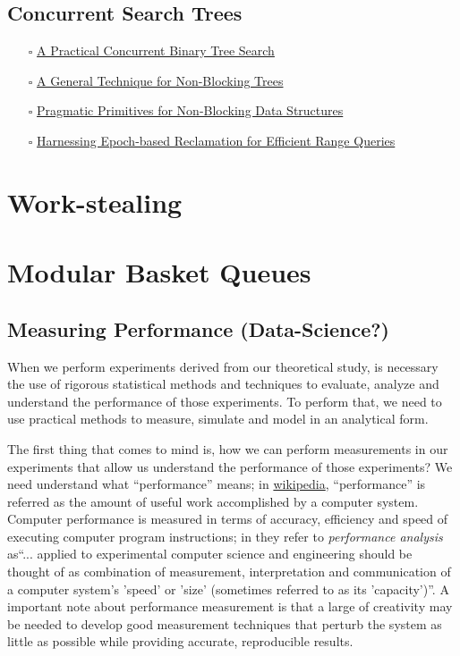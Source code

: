 \documentclass[openany, a4paper]{book}
\theoremstyle{break}
\theoremstyle{example}
\theoremstyle{note}
\theoremstyle{break}
\theoremstyle{exercise}
\begin{document}
\chapter{Concurrent Search Trees}
\label{sec:org516cccd}

\begin{itemize}
\item[{$\square$}] \href{http://ppl.stanford.edu/papers/ppopp207-bronson.pdf}{A Practical Concurrent Binary Tree Search}
\item[{$\square$}] \href{https://arxiv.org/abs/1712.06687}{A General Technique for Non-Blocking Trees}
\item[{$\square$}] \href{https://arxiv.org/abs/1712.06688}{Pragmatic Primitives for Non-Blocking Data Structures}
\item[{$\square$}] \href{http://www.cs.toronto.edu/\~tabrown/ebrrq/paper.ppopp18.pdf}{Harnessing Epoch-based Reclamation for Efficient Range Queries}
\end{itemize}


\part{Work-stealing}
\label{sec:org966aa3a}




\part{Modular Basket Queues}
\label{sec:org184c5d5}

\chapter{Measuring Performance (Data-Science?)}
\label{sec:org3526d9a}

When we perform experiments derived from our theoretical study, is necessary
the use of rigorous statistical methods and techniques to evaluate, analyze
and understand the performance of those experiments. To perform that, we need
to use practical methods to measure, simulate and model in an analytical
form.

The first thing that comes to mind is, how we can perform measurements in our
experiments that allow us understand the performance of those experiments? We
need understand what ``performance'' means; in \href{https://en.wikipedia.org/wiki/Computer\_performance}{wikipedia}, ``performance'' is
referred as the amount of useful work accomplished by a computer
system. Computer performance is measured in terms of accuracy, efficiency and
speed of executing computer program instructions; in \cite{lilja2005measuring}
they refer to \emph{performance analysis} as``... applied to experimental computer
science and engineering should be thought of as combination of measurement,
interpretation and communication of a computer system's 'speed' or 'size'
(sometimes referred to as its 'capacity')''. A important note about
performance measurement is that a large of creativity may be needed to
develop good measurement techniques that perturb the system as little as
possible while providing accurate, reproducible
results\cite{lilja2005measuring}.
\end{document}
